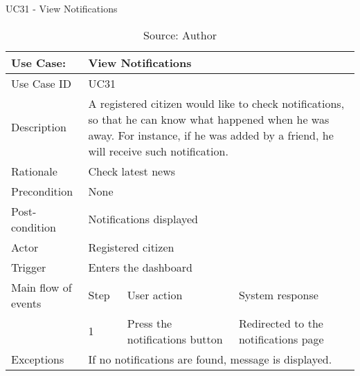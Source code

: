 \begin{table}[ht]
\centering
\caption{UC31 - View Notifications}
\label{uc:31}
\begin{tabular}{|p{3cm}|p{1cm}|p{5cm}|p{5cm}|}
\hline
Use Case:       & \multicolumn{3}{p{11cm}|}{View Notifications} \\ \hline
Use Case ID     & \multicolumn{3}{p{11cm}|}{UC31} \\ \hline
Description     & \multicolumn{3}{p{11cm}|}{A registered citizen would like to check notifications, so that he can know what happened when he was away. For instance, if he was added by a friend, he will receive such notification.} \\ \hline
Rationale       & \multicolumn{3}{p{11cm}|}{Check latest news} \\ \hline
Precondition    & \multicolumn{3}{p{11cm}|}{None} \\ \hline
Post-condition  & \multicolumn{3}{p{11cm}|}{Notifications displayed} \\ \hline
Actor           & \multicolumn{3}{p{11cm}|}{Registered citizen} \\ \hline
Trigger         & \multicolumn{3}{p{11cm}|}{Enters the dashboard} \\ \hline
Main flow of events & Step  & User action & System response \\ \hline
                    & 1     & Press the notifications button & Redirected to the notifications page \\ \hline
Exceptions      & \multicolumn{3}{p{11cm}|}{If no notifications are found, message is displayed.} \\ \hline
\end{tabular}
\caption*{Source: Author}
\end{table}

